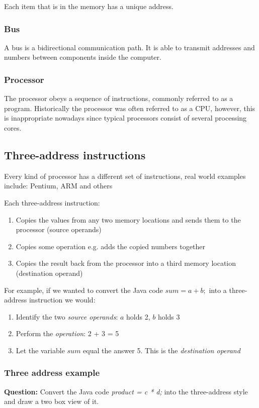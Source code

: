 \documentclass{article}
\begin{document}
Each item that is in the memory has a unique address.

\subsubsection{Bus}
A bus is a bidirectional communication path. It is able to transmit addresses and numbers between components inside the computer.

\subsubsection{Processor}
The processor obeys a sequence of instructions, commonly referred to as a program.
Historically the processor was often referred to as a CPU, however, this is inappropriate nowadays since typical processors consist of several processing cores.

\subsection{Three-address instructions}
Every kind of processor has a different set of instructions, real world examples include: Pentium, ARM and others

Each three-address instruction:
\begin{enumerate}
	\item Copies the values from any two memory locations and sends them to the processor (source operands)
	\item Copies some operation e.g. adds the copied numbers together
	\item Copies the result back from the processor into a third memory location (destination operand)
\end{enumerate}

For example, if we wanted to convert the Java code $sum = a + b;$ into a three-address instruction we would:
\begin{enumerate}
	\item Identify the two {\it source operands}: $a$ holds 2, $b$ holds 3
	\item Perform the {\it operation}: 2 + 3 = 5
	\item Let the variable $sum$ equal the answer 5. This is the {\it destination operand}
\end{enumerate}

\subsubsection{Three address example}
{\bf Question:} Convert the Java code {\it product = c * d;} into the three-address style and draw a two box view of it.
\end{document}
